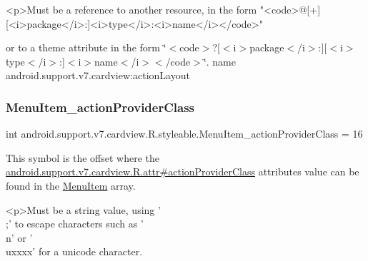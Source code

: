 \begin{DoxyVerb}      <p>Must be a reference to another resource, in the form "<code>@[+][<i>package</i>:]<i>type</i>:<i>name</i></code>"
\end{DoxyVerb}
 or to a theme attribute in the form \char`\"{}$<$code$>$?\mbox{[}$<$i$>$package$<$/i$>$\+:\mbox{]}\mbox{[}$<$i$>$type$<$/i$>$\+:\mbox{]}$<$i$>$name$<$/i$>$$<$/code$>$\char`\"{}.  name android.\+support.\+v7.\+cardview\+:action\+Layout \mbox{\label{classandroid_1_1support_1_1v7_1_1cardview_1_1R_1_1styleable_a2fcf53a7e48550c4f268ac01853a1655}} 
\subsubsection{\texorpdfstring{Menu\+Item\+\_\+action\+Provider\+Class}{MenuItem\_actionProviderClass}}
{\footnotesize\ttfamily int android.\+support.\+v7.\+cardview.\+R.\+styleable.\+Menu\+Item\+\_\+action\+Provider\+Class = 16\hspace{0.3cm}{\ttfamily [static]}}

This symbol is the offset where the \hyperlink{classandroid_1_1support_1_1v7_1_1cardview_1_1R_1_1attr_a51040471b6842ab489279352458c9b21}{android.\+support.\+v7.\+cardview.\+R.\+attr\#action\+Provider\+Class} attribute\textquotesingle{}s value can be found in the \hyperlink{classandroid_1_1support_1_1v7_1_1cardview_1_1R_1_1styleable_a0a483b830af809d94b22d4901e758447}{Menu\+Item} array.

\begin{DoxyVerb}      <p>Must be a string value, using '\\;' to escape characters such as '\\n' or '\\uxxxx' for a unicode character.
\end{DoxyVerb}
 

